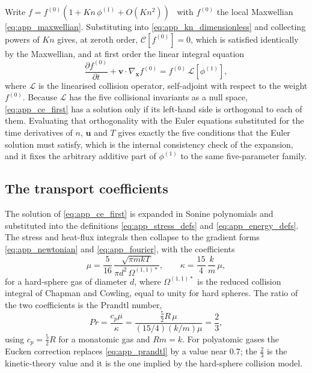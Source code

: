 Write $f = f^{(0)}\left(1 + Kn\,\phi^{(1)} + O(Kn^2)\right)$~\cite{chapman1970kinetic} with $f^{(0)}$ the local Maxwellian \eqref{eq:app_maxwellian}. Substituting into \eqref{eq:app_kn_dimensionless} and collecting powers of $Kn$ gives, at zeroth order, $\mathcal{C}[f^{(0)}] = 0$, which is satisfied identically by the Maxwellian, and at first order the linear integral equation
\begin{equation}
    \frac{\partial f^{(0)}}{\partial t} + \mathbf{v}\cdot\nabla_{\mathbf{x}}f^{(0)}
    = f^{(0)}\,\mathcal{L}[\phi^{(1)}] ,
    \label{eq:app_ce_first}
\end{equation}
where $\mathcal{L}$ is the linearised collision operator, self-adjoint with respect to the weight $f^{(0)}$. Because $\mathcal{L}$ has the five collisional invariants as a null space, \eqref{eq:app_ce_first} has a solution only if its left-hand side is orthogonal to each of them. Evaluating that orthogonality with the Euler equations substituted for the time derivatives of $n$, $\mathbf{u}$ and $T$ gives exactly the five conditions that the Euler solution must satisfy, which is the internal consistency check of the expansion, and it fixes the arbitrary additive part of $\phi^{(1)}$ to the same five-parameter family.

\subsection{The transport coefficients}

The solution of \eqref{eq:app_ce_first} is expanded in Sonine polynomials and substituted into the definitions \eqref{eq:app_stress_defs} and \eqref{eq:app_energy_defs}. The stress and heat-flux integrals then collapse to the gradient forms \eqref{eq:app_newtonian} and \eqref{eq:app_fourier}, with the coefficients
\begin{equation}
    \mu = \frac{5}{16}\,\frac{\sqrt{\pi mkT}}{\pi d^2\,\Omega^{(1,1)*}} ,
    \qquad
    \kappa = \frac{15}{4}\,\frac{k}{m}\,\mu ,
    \label{eq:app_mu_kappa}
\end{equation}
for a hard-sphere gas of diameter $d$, where $\Omega^{(1,1)*}$ is the reduced collision integral of Chapman and Cowling, equal to unity for hard spheres. The ratio of the two coefficients is the Prandtl number,
\begin{equation}
    Pr = \frac{c_p\mu}{\kappa} = \frac{\tfrac52 R\,\mu}{(15/4)(k/m)\mu} = \frac{2}{3} ,
    \label{eq:app_prandtl}
\end{equation}
using $c_p = \tfrac52 R$ for a monatomic gas and $Rm = k$. For polyatomic gases the Eucken correction replaces \eqref{eq:app_prandtl} by a value near $0.7$; the $\tfrac23$ is the kinetic-theory value and it is the one implied by the hard-sphere collision model.

